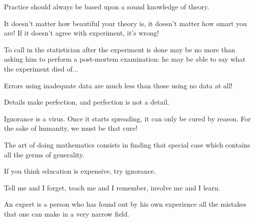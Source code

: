 	\begin{fquote}Practice should always be based upon a sound knowledge of theory.
 	\end{fquote}
 	
 	\begin{fquote}It doesn't matter how beautiful your theory is, it doesn't matter how smart you are! If it doesn't agree with experiment, it's wrong!
 	\end{fquote}
 	
 	\begin{fquote}To call in the statistician after the experiment is done may be no more than asking him to perform a post-mortem examination: he may be able to say what the experiment died of...
 	\end{fquote}
 	
 	\begin{fquote}Errors using inadequate data are much less than those using no data at all!
 	\end{fquote}
 	
 	\begin{fquote}Details make perfection, and perfection is not a detail.
 	\end{fquote}
 	
 	\begin{fquote}Ignorance is a virus. Once it starts spreading, it can only be cured by reason. For the sake of humanity, we must be that cure!
 	\end{fquote}
 	
 	\begin{fquote}The art of doing mathematics consists in finding that special case which contains all the germs of generality. 
 	\end{fquote}

 	\begin{fquote}If you think education is expensive, try ignorance.
 	\end{fquote}
 	
 	 \begin{fquote}Tell me and I forget, teach me and I remember, involve me and I learn.
 	\end{fquote}

 	 \begin{fquote}An expert is a person who has found out by his own experience all the mistakes that one can make in a very narrow field.
 	\end{fquote}
 	
